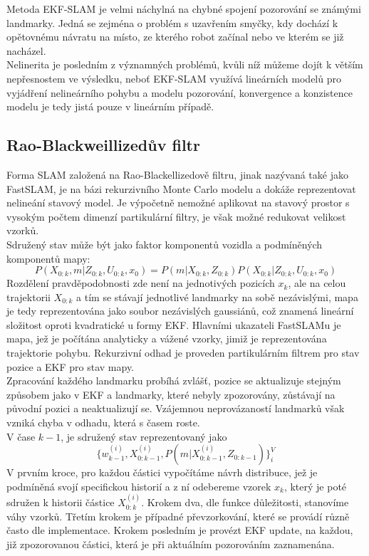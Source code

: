 \documentclass[11pt]{article}
\begin{document}
\indent Metoda EKF-SLAM je velmi náchylná na chybné spojení pozorování se známými landmarky. Jedná se zejména o problém s uzavřením smyčky, kdy dochází k opětovnému návratu na místo, ze kterého robot začínal nebo ve kterém se již nacházel.\\
\indent Nelinerita je posledním z významných problémů, kvůli níž můžeme dojít k větším nepřesnostem ve výsledku, neboť EKF-SLAM využívá lineárních modelů pro vyjádření nelineárního pohybu a modelu pozorování, konvergence a konzistence modelu je tedy jistá pouze v lineárním případě. 


\subsection{Rao-Blackweillizedův filtr}
Forma SLAM založená na Rao-Blackellizedově filtru, jinak nazývaná také jako FastSLAM, je na bázi rekurzivního Monte Carlo modelu a dokáže reprezentovat nelineání stavový model. Je výpočetně nemožné aplikovat na stavový prostor s vysokým počtem dimenzí partikulární filtry, je však možné redukovat velikost vzorků. \\
Sdružený stav může být jako faktor komponentů vozidla a podmíněných komponentů mapy:
$$P(X_{0:k},m|Z_{0:k},U_{0:k},x_0)=P(m|X_{0:k},Z_{0:k})P(X_{0:k}|Z_{0:k},U_{0:k},x_0) $$ 
Rozdělení pravděpodobnosti zde není na jednotivých pozicích $x_k$, ale na celou trajektorii $X_{0:k}$ a tím se stávají jednotlivé landmarky na sobě nezávislými, mapa je tedy reprezentována jako soubor nezávislých gaussiánů, což znamená lineární složitost oproti kvadratické u formy EKF. Hlavními ukazateli FastSLAMu je mapa, jež je počítána analyticky a vážené vzorky, jimiž je reprezentována trajektorie pohybu. Rekurzivní odhad je proveden partikulárním filtrem pro stav pozice a EKF pro stav mapy.\\
\indent Zpracování každého landmarku probíhá zvlášť, pozice se aktualizuje stejným způsobem jako v EKF a landmarky, které nebyly zpozorovány, zůstávají na původní pozici a neaktualizují se. Vzájemnou neprovázaností landmarků však vzniká chyba v odhadu, která s časem roste.\\
\indent V čase $k-1$, je sdružený stav reprezentovaný jako 
$$\{w^{(i)}_{k-1},X^{(i)}_{0:k-1},P(m|X^{(i)}_{0:k-1},Z_{0:k-1})\}^V_i$$
V prvním kroce, pro každou částici vypočítáme návrh distribuce, jež je podmíněná svojí specifickou historií a z ní odebereme vzorek $x_k$, který je poté sdružen k historii částice $X^{(i)}_{0:k}$. Krokem dva, dle funkce důležitosti, stanovíme váhy vzorků. Třetím krokem je případné převzorkování, které se provádí různě často dle implementace. Krokem posledním je provézt EKF update, na každou, již zpozorovanou částici, která je při aktuálním pozorováním zaznamenána. 
\end{document}
